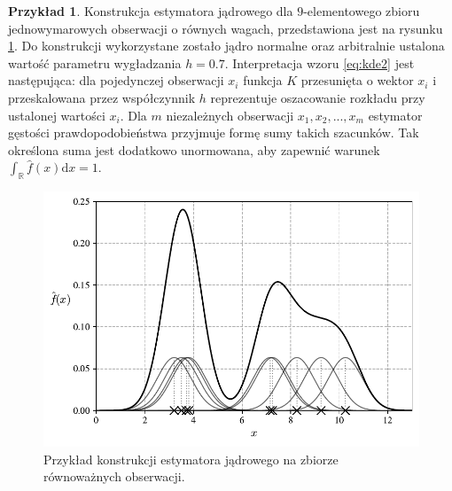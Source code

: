 \documentclass[12pt,a4paper,oneside]{book}
\theoremstyle{definition}
\newtheorem{exmp}{Przykład}[chapter]
\begin{document}
\begin{exmp} \label{exmp:kde_construction}
Konstrukcja estymatora jądrowego dla $9$-elementowego zbioru jednowymarowych obserwacji o równych wagach, przedstawiona jest na rysunku \ref{fig:kde_construction}. Do konstrukcji wykorzystane zostało jądro normalne oraz arbitralnie ustalona wartość parametru wygładzania $h = 0.7$. Interpretacja wzoru \eqref{eq:kde2} jest następująca: dla pojedynczej obserwacji $x_i$ funkcja $K$ przesunięta o wektor $x_i$ i przeskalowana przez współczynnik $h$ reprezentuje oszacowanie rozkładu przy ustalonej wartości $x_i$. Dla $m$ niezależnych obserwacji $x_1, x_2, ..., x_m$ estymator gęstości prawdopodobieństwa przyjmuje formę sumy takich szacunków. Tak określona suma jest dodatkowo unormowana, aby zapewnić warunek $\int_\mathbb{R} \hat{f}(x) \mathrm{d}x = 1$.

\begin{figure}[H]
    \centering
    \includegraphics[scale=0.7]{kde_construction}
    \caption{Przykład konstrukcji estymatora jądrowego na zbiorze równoważnych obserwacji.}
    \label{fig:kde_construction}
\end{figure}
\end{exmp}
\end{document}
